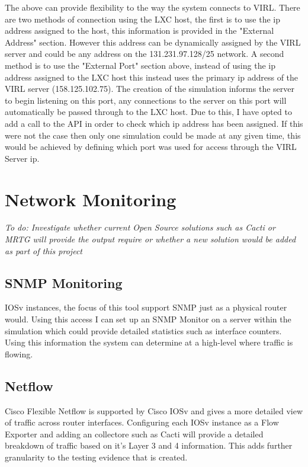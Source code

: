 \documentclass[11pt]{report}
\begin{document}
The above can provide flexibility to the way the system connects to VIRL. There are two methods of connection using the LXC host, the first is to use the ip address assigned to the host, this information is provided in the "External Address" section. However this address can be dynamically assigned by the VIRL server and could be any address on the 131.231.97.128/25 network. A second method is to use the "External Port" section above, instead of using the ip address assigned to the LXC host this instead uses the primary ip address of the VIRL server (158.125.102.75). The creation of the simulation informs the server to begin listening on this port, any connections to the server on this port will automatically be passed through to the LXC host. Due to this, I have opted to add a call to the API in order to check which ip address has been assigned. If this were not the case then only one simulation could be made at any given time, this would be achieved by defining which port was used for access through the VIRL Server ip.

\section{Network Monitoring}

\textit{To do: Investigate whether current Open Source solutions such as Cacti or MRTG will provide the output require or whether a new solution would be added as part of this project}

\subsection{SNMP Monitoring}

IOSv instances, the focus of this tool support SNMP just as a physical router would. Using this access I can set up an SNMP Monitor on a server within the simulation which could provide detailed statistics such as interface counters. Using this information the system can determine at a high-level where traffic is flowing.

\subsection{Netflow}

Cisco Flexible Netflow is supported by Cisco IOSv and gives a more detailed view of traffic across router interfaces. Configuring each IOSv instance as a Flow Exporter and adding an collectore such as Cacti will provide a detailed breakdown of traffic based on it's Layer 3 and 4 information. This adds further granularity to the testing evidence that is created.
\end{document}
